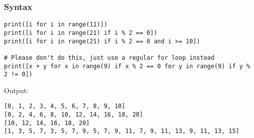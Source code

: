 \documentclass[11pt]{article}
\begin{document}
\subsubsection{Syntax}
\label{sec:orgabbfb60}
\begin{verbatim}
print([i for i in range(11)])
print([i for i in range(21) if i % 2 == 0])
print([i for i in range(21) if i % 2 == 0 and i >= 10])

# Please don't do this, just use a regular for loop instead
print([x + y for x in range(9) if x % 2 == 0 for y in range(9) if y % 2 != 0])
\end{verbatim}

 \noindent Output:

\begin{verbatim}
[0, 1, 2, 3, 4, 5, 6, 7, 8, 9, 10]
[0, 2, 4, 6, 8, 10, 12, 14, 16, 18, 20]
[10, 12, 14, 16, 18, 20]
[1, 3, 5, 7, 3, 5, 7, 9, 5, 7, 9, 11, 7, 9, 11, 13, 9, 11, 13, 15]
\end{verbatim}


 \newpage
\end{document}
